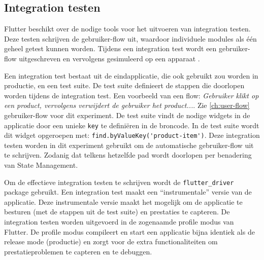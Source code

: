 \subsection{Integration testen}
Flutter beschikt over de nodige tools voor het uitvoeren van integration testen. Deze testen schrijven de gebruiker-flow uit, waardoor individuele modules als één geheel getest kunnen worden. Tijdens een integration test wordt een gebruiker-flow uitgeschreven en vervolgens gesimuleerd op een apparaat \autocite{Flutter2019b}. \newline 

Een integration test bestaat uit de eindapplicatie, die ook gebruikt zou worden in productie, en een test suite. De test suite definieert de stappen die doorlopen worden tijdens de integration test. Een voorbeeld van een flow: \textit{Gebruiker klikt op een product, vervolgens verwijdert de gebruiker het product...}. Zie \ref{ch:user-flow} gebruiker-flow voor dit experiment. De test suite vindt de nodige widgets in de applicatie door een unieke \verb|key| te definiëren in de broncode. In de test suite wordt dit widget opgeroepen met: \verb|find.byValueKey('product-item')|. \newline
Deze integration testen worden in dit experiment gebruikt om de automatische gebruiker-flow uit te schrijven. Zodanig dat telkens hetzelfde pad wordt doorlopen per benadering van State Management.

Om de effectieve integration testen te schrijven wordt de \verb|flutter_driver| package gebruikt.
Een integration test maakt een ``instrumentale'' versie van de applicatie. Deze instrumentale versie maakt het mogelijk om de applicatie te besturen (met de stappen uit de test suite) en prestaties te capteren.
De integration testen worden uitgevoerd in de zogenaamde profile modus van Flutter. De profile modus compileert en start een applicatie bijna identiek als de release mode (productie) en zorgt voor de extra functionaliteiten om prestatieproblemen te capteren en te debuggen.

